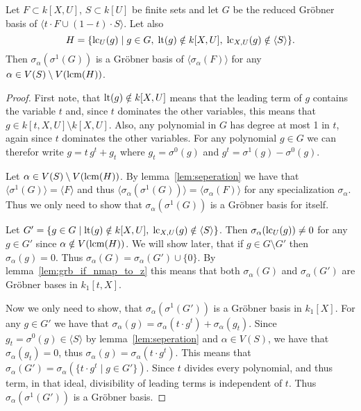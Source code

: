 \begin{lemma}\label{lem:grb_if_nmap_to_z_t}
  Let $F \subset k[X, U]$, $S \subset k[U]$ be finite sets %
  and let $G$ be the reduced Gröbner basis of $\langle t\cdot F \cup (1-t)\cdot S \rangle$. Let also \[H = \{\operatorname{lc}_{U}(g) \mid g \in G,\; \operatorname{lt}(g) \notin k[X, U],\; \operatorname{lc}_{X, U}(g) \notin \langle S \rangle\}.\] Then $\sigma_{\alpha}(\sigma^{1}(G))$ is a Gröbner basis of $\langle \sigma_{\alpha}(F) \rangle$ for any $\alpha \in V(S) \setminus V(\operatorname{lcm}(H))$.
\end{lemma}
\begin{proof}
  First note, that $\operatorname{lt}(g) \notin k[X, U]$ means that the leading term of $g$ contains the variable $t$ and, since $t$ dominates the other variables, this means that $g \in k[t, X, U] \setminus k[X, U]$. Also, any polynomial in $G$ has degree at most 1 in $t$, again since $t$ dominates the other variables. For any polynomial $g \in G$ we can therefor write $g = t\,g^{t} + g_{t}$ where $g_{t} = \sigma^{0}(g)$ and $g^{t} = \sigma^{1}(g) - \sigma^{0}(g)$.

  Let $\alpha \in V(S) \setminus V(\operatorname{lcm}(H))$. By lemma~\ref{lem:seperation} we have that $\langle \sigma^{1}(G) \rangle = \langle F \rangle$ and thus $\langle \sigma_{\alpha}(\sigma^{1}(G)) \rangle = \langle \sigma_{\alpha}(F) \rangle$ for any specialization $\sigma_{\alpha}$. Thus we only need to show that $\sigma_{\alpha}(\sigma^{1}(G))$ is a Gröbner basis for itself.

  Let $G' = \{g \in G \mid \operatorname{lt}(g) \notin k[X, U],\; \operatorname{lc}_{X, U}(g) \notin \langle S \rangle \}$. Then $\sigma_{\alpha}(\operatorname{lc}_{U}(g)) \neq 0$ for any $g \in G'$ since $\alpha \notin V(\operatorname{lcm}(H))$. We will show later, that if $g \in G \setminus G'$ then $\sigma_{\alpha}(g) = 0$. Thus $\sigma_{\alpha}(G) = \sigma_{\alpha}(G') \cup \{0\}$. By lemma~\ref{lem:grb_if_nmap_to_z} this means that both $\sigma_{\alpha}(G)$ and $\sigma_{\alpha}(G')$ are Gröbner bases in $k_{1}[t, X]$.

  Now we only need to show, that $\sigma_{\alpha}(\sigma^{1}(G'))$ is a Gröbner basis in $k_{1}[X]$. For any $g \in G'$ we have that $\sigma_{\alpha}(g) = \sigma_{\alpha}(t\cdot g^{t}) + \sigma_{\alpha}(g_{t})$. Since $g_{t} = \sigma^{0}(g) \in \langle S \rangle$ by lemma~\ref{lem:seperation} and $\alpha \in V(S)$, we have that $\sigma_{\alpha}(g_{t}) = 0$, thus $\sigma_{\alpha}(g) = \sigma_{\alpha}(t \cdot g^{t})$. This means that $\sigma_{\alpha}(G') = \sigma_{\alpha}(\{t \cdot g^{t} \mid g \in G'\})$. Since $t$ divides every polynomial, and thus term, in that ideal, divisibility of leading terms is independent of $t$. Thus $\sigma_{\alpha}(\sigma^{1}(G'))$ is a Gröbner basis.


\end{proof}
